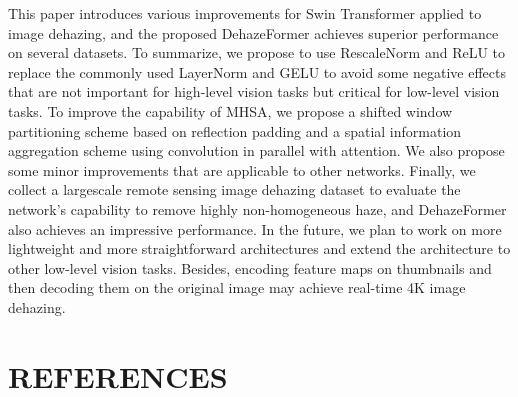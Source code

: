 \documentclass{article}
\begin{document}
This paper introduces various improvements for Swin Transformer applied to image dehazing, and the proposed DehazeFormer achieves superior performance on several datasets. To summarize, we propose to use RescaleNorm and ReLU to replace the commonly used LayerNorm and GELU to avoid some negative effects that are not important for high-level vision tasks but critical for low-level vision tasks. To improve the capability of MHSA, we propose a shifted window partitioning scheme based on reflection padding and a spatial information aggregation scheme using convolution in parallel with attention. We also propose some minor improvements that are applicable to other networks. Finally, we collect a largescale remote sensing image dehazing dataset to evaluate the network’s capability to remove highly non-homogeneous haze, and DehazeFormer also achieves an impressive performance. In the future, we plan to work on more lightweight and more straightforward architectures and extend the architecture to other low-level vision tasks. Besides, encoding feature maps on thumbnails and then decoding them on the original image may achieve real-time 4K image dehazing.


\section{REFERENCES}
\end{document}
